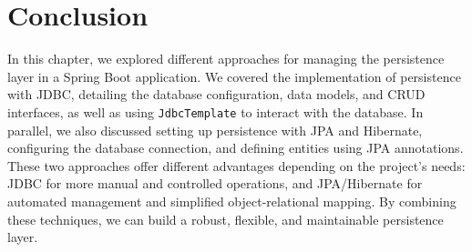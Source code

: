 \documentclass{article}
\begin{document}
\section{Conclusion}

In this chapter, we explored different approaches for managing the persistence layer in a Spring Boot application. We covered the implementation of persistence with JDBC, detailing the database configuration, data models, and CRUD interfaces, as well as using \texttt{JdbcTemplate} to interact with the database. In parallel, we also discussed setting up persistence with JPA and Hibernate, configuring the database connection, and defining entities using JPA annotations. These two approaches offer different advantages depending on the project's needs: JDBC for more manual and controlled operations, and JPA/Hibernate for automated management and simplified object-relational mapping. By combining these techniques, we can build a robust, flexible, and maintainable persistence layer.
\end{document}
